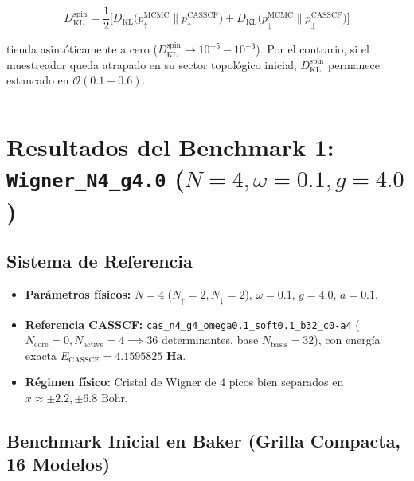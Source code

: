 \documentclass[10pt,a4paper]{article}
\begin{document}
\[
   D_{\mathrm{KL}}^{\mathrm{spin}} = \frac{1}{2}\Big[D_{\mathrm{KL}}\!\big(p_\uparrow^{\mathrm{MCMC}} \parallel p_\uparrow^{\mathrm{CASSCF}}\big) + D_{\mathrm{KL}}\!\big(p_\downarrow^{\mathrm{MCMC}} \parallel p_\downarrow^{\mathrm{CASSCF}}\big)\Big]
\]

   tienda asintóticamente a cero ($D_{\mathrm{KL}}^{\mathrm{spin}} \to 10^{-5} - 10^{-3}$). Por el contrario, si el muestreador queda atrapado en su sector topológico inicial, $D_{\mathrm{KL}}^{\mathrm{spin}}$ permanece estancado en $\mathcal{O}(0.1 - 0.6)$.




\vspace{0.4cm}\hrule\vspace{0.4cm}




\section{Resultados del Benchmark 1: \texttt{Wigner\_N4\_g4.0} ($N=4, \omega=0.1, g=4.0$)}




\subsection{Sistema de Referencia}

\begin{itemize}
\item \textbf{Parámetros físicos:} $N=4$ ($N_\uparrow=2, N_\downarrow=2$), $\omega=0.1$, $g=4.0$, $a=0.1$.
\item \textbf{Referencia CASSCF:} \texttt{cas\_n4\_g4\_omega0.1\_soft0.1\_b32\_c0-a4} ($N_{\mathrm{core}}=0, N_{\mathrm{active}}=4 \implies 36$ determinantes, base $N_{\mathrm{basis}}=32$), con energía exacta $E_{\mathrm{CASSCF}} = \mathbf{4.1595825\text{ Ha}}$.
\item \textbf{Régimen físico:} Cristal de Wigner de 4 picos bien separados en $x \approx \pm 2.2, \pm 6.8\text{ Bohr}$.
\end{itemize}




\subsection{Benchmark Inicial en Baker (Grilla Compacta, 16 Modelos)}
\end{document}
